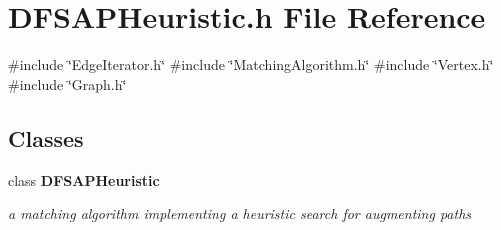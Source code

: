 \section{D\+F\+S\+A\+P\+Heuristic.\+h File Reference}
\label{DFSAPHeuristic_8h}
{\ttfamily \#include \char`\"{}Edge\+Iterator.\+h\char`\"{}}\newline
{\ttfamily \#include \char`\"{}Matching\+Algorithm.\+h\char`\"{}}\newline
{\ttfamily \#include \char`\"{}Vertex.\+h\char`\"{}}\newline
{\ttfamily \#include \char`\"{}Graph.\+h\char`\"{}}\newline
\subsection*{Classes}
\begin{DoxyCompactItemize}
\item 
class \textbf{ D\+F\+S\+A\+P\+Heuristic}
\begin{DoxyCompactList}\small\item\em a matching algorithm implementing a heuristic search for augmenting paths \end{DoxyCompactList}\end{DoxyCompactItemize}
